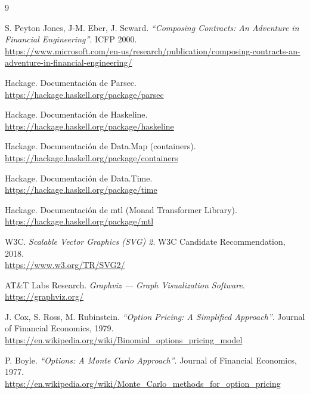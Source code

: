 \documentclass[a4paper, 12pt]{article}
\begin{document}
\begin{thebibliography}{9}

S. Peyton Jones, J-M. Eber, J. Seward.
\textit{``Composing Contracts: An Adventure in Financial Engineering''}.
ICFP 2000.
\\\url{https://www.microsoft.com/en-us/research/publication/composing-contracts-an-adventure-in-financial-engineering/}

Hackage. Documentación de Parsec.
\\\url{https://hackage.haskell.org/package/parsec}

Hackage. Documentación de Haskeline.
\\\url{https://hackage.haskell.org/package/haskeline}

Hackage. Documentación de Data.Map (containers).
\\\url{https://hackage.haskell.org/package/containers}

Hackage. Documentación de Data.Time.
\\\url{https://hackage.haskell.org/package/time}

Hackage. Documentación de mtl (Monad Transformer Library).
\\\url{https://hackage.haskell.org/package/mtl}

W3C. \textit{Scalable Vector Graphics (SVG) 2}.
W3C Candidate Recommendation, 2018.
\\\url{https://www.w3.org/TR/SVG2/}

AT\&T Labs Research. \textit{Graphviz --- Graph Visualization Software}.
\\\url{https://graphviz.org/}

J. Cox, S. Ross, M. Rubinstein.
\textit{``Option Pricing: A Simplified Approach''}.
Journal of Financial Economics, 1979.
\\\url{https://en.wikipedia.org/wiki/Binomial_options_pricing_model}

P. Boyle.
\textit{``Options: A Monte Carlo Approach''}.
Journal of Financial Economics, 1977.
\\\url{https://en.wikipedia.org/wiki/Monte_Carlo_methods_for_option_pricing}
\end{thebibliography}
\end{document}
